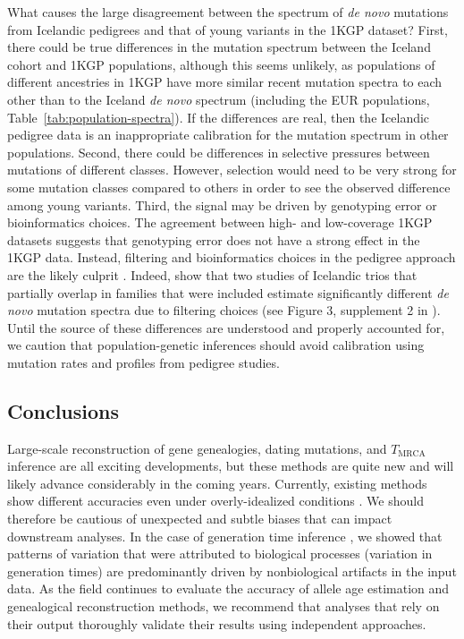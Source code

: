 \documentclass[]{article}
\begin{document}
What causes the large disagreement between the spectrum of \emph{de novo}
mutations from Icelandic pedigrees and that of young variants in the 1KGP
dataset? First, there could be true differences in the mutation spectrum
between the Iceland cohort and 1KGP populations, although this seems unlikely,
as populations of different ancestries in 1KGP have more similar recent
mutation spectra to each other than to the Iceland \emph{de novo} spectrum
(including the EUR populations, Table~\ref{tab:population-spectra}). If the
differences are real, then the Icelandic pedigree data is an inappropriate
calibration for the mutation spectrum in other populations. Second, there could
be differences in selective pressures between mutations of different classes.
However, selection would need to be very strong for some mutation classes
compared to others in order to see the observed difference among young
variants. Third, the signal may be driven by genotyping error or bioinformatics
choices. The agreement between high- and low-coverage 1KGP datasets suggests
that genotyping error does not have a strong effect in the 1KGP data. Instead,
filtering and bioinformatics choices in the pedigree approach are the likely
culprit \citep{bergeron2022mutationathon}. Indeed, \citet{gao2023limited} show
that two studies of Icelandic trios that partially overlap in families that
were included \citep{jonsson2017parental,halldorsson2019characterizing}
estimate significantly different \emph{de novo} mutation spectra due to
filtering choices (see Figure 3, supplement 2 in \citeauthor{gao2023limited}).
Until the source of these differences are understood and properly accounted
for, we caution that population-genetic inferences should avoid calibration
using mutation rates and profiles from pedigree studies.

\subsection*{Conclusions}

Large-scale reconstruction of gene genealogies, dating mutations, and
$T_\text{MRCA}$ inference are all exciting developments, but these methods are
quite new and will likely advance considerably in the coming years. Currently,
existing methods show different accuracies even under overly-idealized
conditions \citep{brandt2022evaluation}. We should therefore be cautious of
unexpected and subtle biases that can impact downstream analyses. In the case
of generation time inference \citep{wang2023human}, we showed that patterns of
variation that were attributed to biological processes (variation in generation
times) are predominantly driven by nonbiological artifacts in the input data.
As the field continues to evaluate the accuracy of allele age estimation and
genealogical reconstruction methods, we recommend that analyses that rely on
their output thoroughly validate their results using independent approaches.
\end{document}
